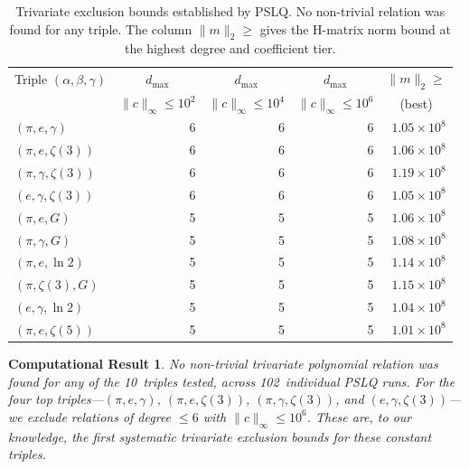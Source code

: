 \documentclass[11pt]{amsart}
\newtheorem{result}[theorem]{Computational Result}
\theoremstyle{remark}
\newcommand{\norm}[1]{\lVert #1 \rVert}
\begin{document}
\begin{table}[ht]
\centering
\caption{Trivariate exclusion bounds established by PSLQ. No non-trivial
relation was found for any triple. The column $\norm{m}_2\!\ge$ gives the
H-matrix norm bound at the highest degree and coefficient tier.}\label{tab:trivariate}
\smallskip
\begin{tabular}{@{}l rrrr@{}}
\toprule
Triple $(\alpha,\beta,\gamma)$
  & \multicolumn{1}{c}{$d_{\max}$}
  & \multicolumn{1}{c}{$d_{\max}$}
  & \multicolumn{1}{c}{$d_{\max}$}
  & \multicolumn{1}{c}{$\norm{m}_2\!\ge$} \\
  & \multicolumn{1}{c}{\scriptsize$\norm{c}_\infty\!\le\!10^2$}
  & \multicolumn{1}{c}{\scriptsize$\norm{c}_\infty\!\le\!10^4$}
  & \multicolumn{1}{c}{\scriptsize$\norm{c}_\infty\!\le\!10^6$}
  & \multicolumn{1}{c}{\scriptsize(best)} \\
\midrule
$(\pi, e, \gamma)$        & 6 & 6 & 6 & $1.05 \times 10^8$ \\
$(\pi, e, \zeta(3))$      & 6 & 6 & 6 & $1.06 \times 10^8$ \\
$(\pi, \gamma, \zeta(3))$ & 6 & 6 & 6 & $1.19 \times 10^8$ \\
$(e, \gamma, \zeta(3))$   & 6 & 6 & 6 & $1.05 \times 10^8$ \\
$(\pi, e, G)$             & 5 & 5 & 5 & $1.06 \times 10^8$ \\
$(\pi, \gamma, G)$        & 5 & 5 & 5 & $1.08 \times 10^8$ \\
$(\pi, e, \ln 2)$         & 5 & 5 & 5 & $1.14 \times 10^8$ \\
$(\pi, \zeta(3), G)$      & 5 & 5 & 5 & $1.15 \times 10^8$ \\
$(e, \gamma, \ln 2)$      & 5 & 5 & 5 & $1.04 \times 10^8$ \\
$(\pi, e, \zeta(5))$      & 5 & 5 & 5 & $1.01 \times 10^8$ \\
\bottomrule
\end{tabular}
\end{table}

\begin{result}\label{res:trivariate}
No non-trivial trivariate polynomial relation was found for any of the
10~triples tested, across 102~individual PSLQ runs. For the four top
triples---$(\pi,e,\gamma)$, $(\pi,e,\zeta(3))$,
$(\pi,\gamma,\zeta(3))$, and $(e,\gamma,\zeta(3))$---we exclude
relations of degree $\le 6$ with $\norm{c}_\infty \le 10^6$.
These are, to our knowledge, the first systematic trivariate exclusion
bounds for these constant triples.
\end{result}
\end{document}
